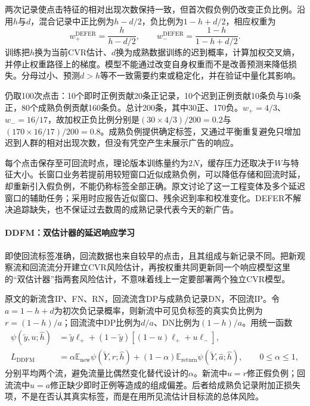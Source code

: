 两次记录使点击特征的相对出现次数保持一致，但首次假负例仍改变正负比例。沿用$h$与$d$，混合记录中正比例为$h-d/2$，负比例为$1-h+d/2$，相应权重为
\begin{equation}
  w_+^{\mathrm{DEFER}}=\frac{h}{h-d/2},\qquad
  w_-^{\mathrm{DEFER}}=\frac{1-h}{1-h+d/2}.
  \label{eq:rs-advertising-defer}
\end{equation}
训练把$h$换为当前CVR估计、$d$换为成熟数据训练的迟到概率，计算加权交叉熵，并停止权重路径上的梯度。模型不能通过改变自身权重而不是改善预测来降低损失。分母过小、预测$d>h$等不一致需要约束或稳定化，并在验证中量化其影响。

仍取100次点击：10个即时正例贡献20条正记录，10个迟到正例贡献10条负与10条正，80个成熟负例贡献160条负。总计200条，其中30正、170负。$w_+=4/3$、$w_-=16/17$，故加权正负比例分别是$(30\times4/3)/200=0.2$与$(170\times16/17)/200=0.8$。成熟负例提供确定标签，又通过平衡重复避免只增加迟到人群的相对出现次数，但没有凭空产生未展示广告的响应。

每个点击保存至可回流时点，理论版本训练量约为$2N$，缓存压力还取决于$W$与特征大小。长窗口业务若提前用较短窗口近似成熟负例，可以降低存储和回流时延，却重新引入假负例，不能仍称标签全部正确。原文讨论了这一工程变体及多个延迟窗口的辅助任务；采用时应报告近似窗口、残余迟到率和校准变化。DEFER不解决追踪缺失，也不保证过去数周的成熟记录代表今天的新广告。

\paragraph{DDFM：双估计器的延迟响应学习}
\label{sec:rs-advertising-ddfm}

即使回流标签准确，回流数据也来自较早的点击，且其组成与新记录不同。把新观察流和回流流分开建立CVR风险估计，再按权重共同更新同一个响应模型这里的“双估计器”指两套风险估计，不意味着线上一定要部署两个独立CVR模型。

原文的新流含IP、FN、RN，回流流含DP与成熟负记录DN，不回流IP。令$a=1-h+d$为初次负记录概率，则新流中可见负标签的真实负比例为$r=(1-h)/a$；回流流中DP比例为$d/a$、DN比例为$(1-h)/a$。用统一函数
\begin{equation}
  \begin{aligned}
    \psi(\widetilde y,u;\widehat h)
      &=\widetilde y\ell_+
       +(1-\widetilde y)[(1-u)\ell_++u\ell_-],\\
    L_{\mathrm{DDFM}}
      &=\alpha\mathbb{E}_{\mathrm{new}}\psi(\widetilde Y,\widehat r;\widehat h)
        +(1-\alpha)\mathbb{E}_{\mathrm{return}}
           \psi(\widetilde Y,\widehat a;\widehat h),
        \qquad 0\leq\alpha\leq1,
  \end{aligned}
  \label{eq:rs-advertising-ddfm}
\end{equation}
分别平均两个流，避免流量比偶然变化替代设计的$\alpha$。新流中$u=r$修正假负例；回流流中$u=a$修正缺少即时正例等造成的组成偏差。后者给成熟负记录附加正损失项，不是在否认其真实标签，而是在用所见流估计目标流的总体风险。

